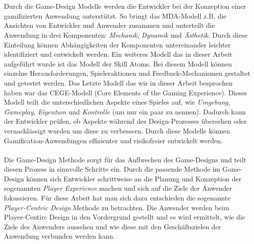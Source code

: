 \documentclass[a4paper,12pt]{scrartcl}
\begin{document}
\\\\  
Durch die Game-Design Modelle werden die Entwickler bei der Konzeption einer gamifizierten Anwendung unterstützt. So bringt das MDA-Modell z.B. die Ansichten von Entwickler und Anwender zusammen und unterteilt die Anwendung in drei Komponenten: \textit{Mechanik}, \textit{Dynamik} und \textit{Ästhetik}. Durch diese Einteilung können Abhängigkeiten der Komponenten untereinander leichter identifiziert und entwickelt werden. Ein weiteres Modell das in dieser Arbeit aufgeführt wurde ist das Modell der Skill Atoms. Bei diesem Modell können einzelne Herausforderungen, Spieleraktionen und Feedback-Mechanismen gestaltet und getestet werden. Das Letzte Modell das wir in dieser Arbeit besprochen haben war das CEGE-Modell (Core Elements of the Gaming Experience). Dieses Modell teilt die unterschiedlichen Aspekte eines Spieles auf, wie \textit{Umgebung}, \textit{Gameplay}, \textit{Eigentum} und \textit{Kontrolle} (um nur ein paar zu nennen). Dadurch kann der Entwickler prüfen, ob Aspekte während des Design-Prozesses übersehen oder vernachlässigt wurden um diese zu verbessern. Durch diese Modelle können Gamification-Anwendungen effizienter und risikofreier entwickelt werden.    
\\\\
Die Game-Design Methode sorgt für das Aufbrechen des Game-Designs und teilt diesen Prozess in sinnvolle Schritte ein. Durch die passende Methode im Game-Design können sich Entwickler schrittweise an die Planung und Konzeption der sogenannten \textit{Player Experience} machen und sich auf die Ziele der Anwender fokussieren. Für diese Arbeit hat man sich dazu entschieden die sogenannte \textit{Player-Centric Design} Methode zu betrachten. Die Anwender werden beim Player-Centirc Design in den Vordergrund gestellt und es wird ermittelt, wie die Ziele des Anwenders aussehen und wie diese mit den Geschäftszielen der Anwendung verbunden werden kann.    
\\\\
\end{document}
